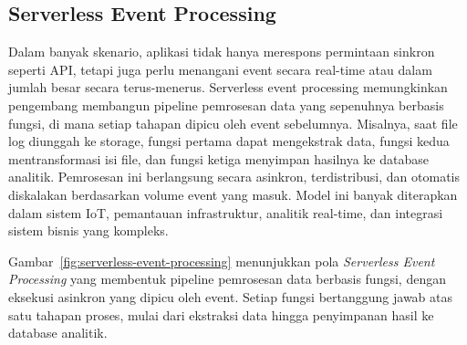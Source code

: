 \subsection{Serverless Event Processing}

Dalam banyak skenario, aplikasi tidak hanya merespons permintaan sinkron seperti API, tetapi juga perlu menangani event secara real-time atau dalam jumlah besar secara terus-menerus. Serverless event processing memungkinkan pengembang membangun pipeline pemrosesan data yang sepenuhnya berbasis fungsi, di mana setiap tahapan dipicu oleh event sebelumnya. Misalnya, saat file log diunggah ke storage, fungsi pertama dapat mengekstrak data, fungsi kedua mentransformasi isi file, dan fungsi ketiga menyimpan hasilnya ke database analitik. Pemrosesan ini berlangsung secara asinkron, terdistribusi, dan otomatis diskalakan berdasarkan volume event yang masuk. Model ini banyak diterapkan dalam sistem IoT, pemantauan infrastruktur, analitik real-time, dan integrasi sistem bisnis yang kompleks.

Gambar~\ref{fig:serverless-event-processing} menunjukkan pola \textit{Serverless Event Processing} yang membentuk pipeline pemrosesan data berbasis fungsi, dengan eksekusi asinkron yang dipicu oleh event. Setiap fungsi bertanggung jawab atas satu tahapan proses, mulai dari ekstraksi data hingga penyimpanan hasil ke database analitik.

